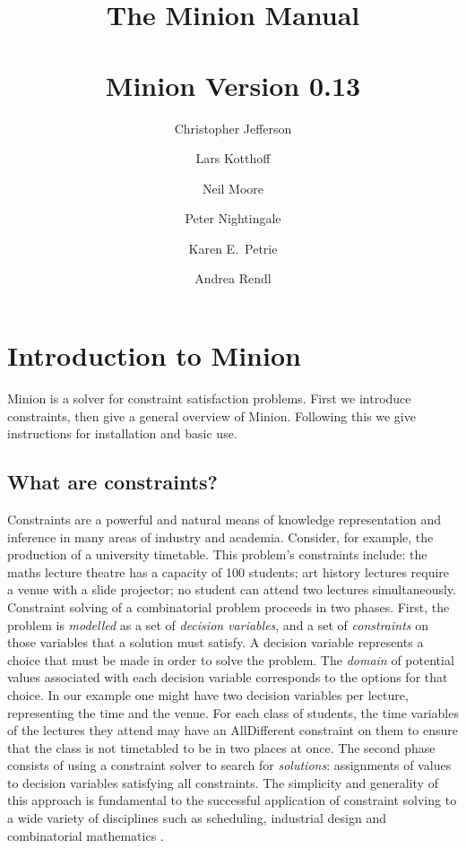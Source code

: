 \documentclass[oneside]{book}
\def\minionversion{0.13}
\begin{document}
\title{{\bf The Minion Manual}\\
~\\
Minion Version \minionversion}
\author{Christopher Jefferson \and Lars Kotthof\/f \and Neil Moore \and Peter Nightingale \and Karen E.\ Petrie \and Andrea Rendl}

\maketitle
\tableofcontents

\chapter{Introduction to Minion}

Minion is a solver for constraint satisfaction problems. First we
introduce constraints, then give a general overview of Minion. Following
this we give instructions for installation and basic use.


\section{What are constraints?}

Constraints are a powerful and natural means of knowledge representation
and inference in many areas of industry and academia. Consider, for
example, the production of a university timetable. This problem's
constraints include: the maths lecture theatre has a capacity of 100
students; art history lectures require a venue with a slide projector;
no student can attend two lectures simultaneously. Constraint solving
of a combinatorial problem proceeds in two phases. First, the problem
is \emph{modelled} as a set of \emph{decision variables}, and a set
of \emph{constraints} on those variables that a solution must satisfy.
A decision variable represents a choice that must be made in order
to solve the problem. The \emph{domain} of potential values associated
with each decision variable corresponds to the options for that choice.
In our example one might have two decision variables per lecture,
representing the time and the venue. For each class of students, the
time variables of the lectures they attend may have an AllDifferent
constraint on them to ensure that the class is not timetabled to be
in two places at once. The second phase consists of using a constraint
solver to search for \emph{solutions}: assignments of values to decision
variables satisfying all constraints. The simplicity and generality
of this approach is fundamental to the successful application of constraint
solving to a wide variety of disciplines such as scheduling, industrial
design and combinatorial mathematics \cite{wallace:Survey}.
\end{document}
